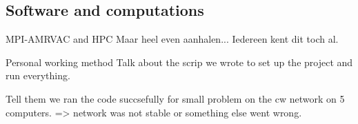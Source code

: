 \subsection{Software and computations}

\begin{frame}{MPI-AMRVAC and HPC}
Maar heel even aanhalen...
Iedereen kent dit toch al.
\end{frame}

\begin{frame}{Personal working method}
Talk about the scrip we wrote to set up the project and run everything.


Tell them we ran the code succsefully for small problem on the cw network on 5 computers. => network was not stable or something else went wrong.
\end{frame}
